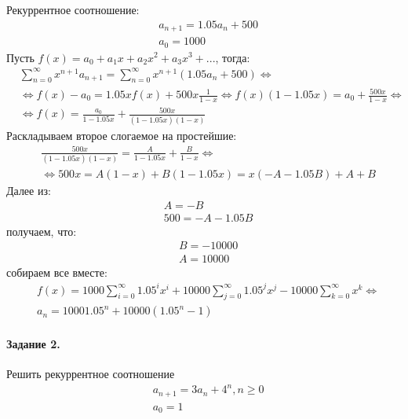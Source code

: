 \documentclass[a4paper,12pt]{article}
\begin{document}
\begin{Solution}
Рекуррентное соотношение:
\[
	\begin{split}
		& a_{n+1} = 1.05 a_{n} + 500 \\
		& a_0 = 1000
	\end{split}
\]
Пусть $f\left(x\right) = a_0 + a_1 x + a_2 x^2 + a_3 x^3 + ...$, тогда:
\[
	\begin{split}
		& \sum_{n=0}^{\infty} x^{n+1} a_{n+1} = \sum_{n=0}^{\infty} x^{n+1} \left(1.05 a_{n} + 500\right) \Leftrightarrow \\
		& \Leftrightarrow f\left(x\right) - a_0 = 1.05 x f\left(x\right) + 500 x \frac{1}{1-x} \Leftrightarrow f\left(x\right) \left(1 - 1.05x\right) = a_0 + \frac{500x}{1-x} \Leftrightarrow \\
		& \Leftrightarrow f\left(x\right) = \frac{a_0}{1 - 1.05 x} + \frac{500x}{\left(1-1.05 x\right)\left(1-x\right)}
	\end{split}
\]
Раскладываем второе слогаемое на простейшие:
\[
	\begin{split}
		& \frac{500x}{\left(1-1.05 x\right)\left(1-x\right)} = \frac{A}{1 - 1.05x} + \frac{B}{1 - x} \Leftrightarrow \\
		& \Leftrightarrow 500x = A \left(1-x\right) + B \left(1-1.05x\right) = x \left(-A - 1.05 B\right) + A + B
	\end{split}
\]
Далее из:
\[
	\begin{split}
		& A = -B \\
		& 500 = -A - 1.05 B
	\end{split}
\]
получаем, что:
\[
	\begin{split}
		& B = -10000 \\
		& A = 10000
	\end{split}
\]
собираем все вместе:
\[
	\begin{split}
		& f\left(x\right) = 1000 \sum_{i=0}^{\infty} 1.05^i x^i + 10000 \sum_{j=0}^{\infty} 1.05^j x^j - 10000 \sum_{k=0}^{\infty} x^k \Leftrightarrow \\
		& a_n = 1000 1.05^n + 10000 \left(1.05^n - 1\right)
	\end{split}
\]
\end{Solution}

\paragraph{Задание 2.} Решить рекуррентное соотношение
\[
	\begin{split}
		& a_{n+1} = 3 a_n + 4^n , n \ge 0 \\
		& a_0 = 1
	\end{split}
\]
\end{document}
